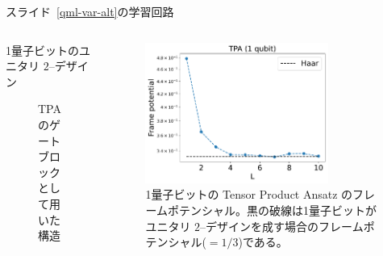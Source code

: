 \documentclass[dvipdfmx,10pt,aspectratio=169]{beamer}
\begin{document}
\begin{frame}{スライド~\ref{qml-var-alt}の学習回路}
    \begin{columns}
        \begin{column}{0.5\textwidth}
        1量子ビットのユニタリ $2$--デザイン
        \begin{figure}[H]
            \centering
            \caption{TPA のゲートブロックとして用いた構造}
            \label{fig:tpa-example}
        \end{figure}
        \end{column}
        
        \begin{column}{0.5\textwidth}
            \begin{figure}[H]
                \centering
                \includegraphics[width=6cm]{1qubit-tpa-exp.pdf}
                \caption{1量子ビットの Tensor Product Ansatz のフレームポテンシャル。黒の破線は1量子ビットがユニタリ $2$--デザインを成す場合のフレームポテンシャル($=1/3$)である。}
                \label{fig:1qubit-tpa-exp}
            \end{figure}
        \end{column}
    \end{columns}
\end{frame}
\end{document}
